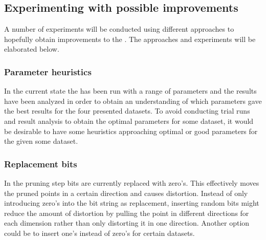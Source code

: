 \subsection{Experimenting with possible improvements}
A number of experiments will be conducted using different approaches to hopefully obtain improvements to the \qs{}. The approaches and experiments will be elaborated below.

\subsubsection{Parameter heuristics}
In the current state the \qs{} has been run with a range of parameters and the results have been analyzed in order to obtain an understanding of which parameters gave the best results for the four presented datasets. To avoid conducting trial runs and result analysis to obtain the optimal parameters for some dataset, it would be desirable to have some heuristics approaching optimal or good parameters for the \qs{} given some dataset.

\subsubsection{Replacement bits}
In the pruning step bits are currently replaced with zero's. This effectively moves the pruned points in a certain direction and causes distortion. Instead of only introducing zero's into the bit string as replacement, inserting random bits might reduce the amount of distortion by pulling the point in different directions for each dimension rather than only distorting it in one direction. Another option could be to insert one's instead of zero's for certain datasets. 

\clearpage